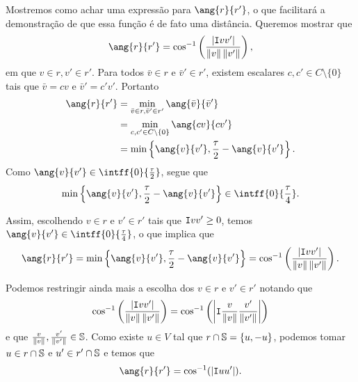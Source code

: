 Mostremos como achar uma expressão para $\ang{r}{r'}$, o que facilitará a demonstração de que essa função é de fato uma distância. Queremos mostrar que
	\begin{equation*}
	\ang{r}{r'} = \cos\inv \left( \frac{\abs{\inte{v}{v'}}}{\nor{v}\nor{v'}} \right),
	\end{equation*}
em que $v \in r, v' \in r'$. Para todos $\bar v \in r$ e $\bar v' \in r'$, existem escalares $c,c' \in C \setminus \{0\}$ tais que $\bar v = cv$ e $\bar v' = c'v'$. Portanto
	\begin{align*}
	\ang{r}{r'} &= \min_{\bar v \in r, \bar v' \in r'} \ang{\bar v}{\bar v'} \\
		&= \min_{c,c' \in C \setminus \{0\}} \ang{cv}{cv'} \\
		&= \min \left\{ \ang{v}{v'}, \frac{\tau}{2} - \ang{v}{v'} \right\}.
	\end{align*}
Como $\ang{v}{v'} \in \intff{0}{\frac{\tau}{2}}$, segue que
	\begin{equation*}
	\min \left\{ \ang{v}{v'}, \frac{\tau}{2} - \ang{v}{v'} \right\} \in \intff{0}{\frac{\tau}{4}}.
	\end{equation*}

Assim, escolhendo $v \in r$ e $v' \in r'$ tais que $\inte{v}{v'} \geq 0$, temos $\ang{v}{v'} \in \intff{0}{\frac{\tau}{4}}$, o que implica que
	\begin{equation*}
	\ang{r}{r'} = \min \left\{ \ang{v}{v'}, \frac{\tau}{2} - \ang{v}{v'} \right\} = \cos\inv \left( \frac{\abs{\inte{v}{v'}}}{\nor{v}\nor{v'}} \right).
	\end{equation*}

Podemos restringir ainda mais a escolha dos $v \in r$ e $v' \in r'$ notando que
	\begin{equation*}
	\cos\inv \left( \frac{\abs{\inte{v}{v'}}}{\nor{v}\nor{v'}} \right) = \cos\inv \left( \abs{\inte{\frac{v}{\nor{v}}}{\frac{v'}{\nor{v'}}}} \right)
	\end{equation*}
e que $\frac{v}{\nor{v}},\frac{v'}{\nor{v'}} \in \S$. Como existe $u \in V$ tal que $r \cap \S = \{u,-u\}$, podemos tomar $u \in r \cap \S$ e $u' \in r' \cap \S$ e temos que
	\begin{equation*}
	\ang{r}{r'} = \cos\inv (\abs{\inte{u}{u'}}).
	\end{equation*}

